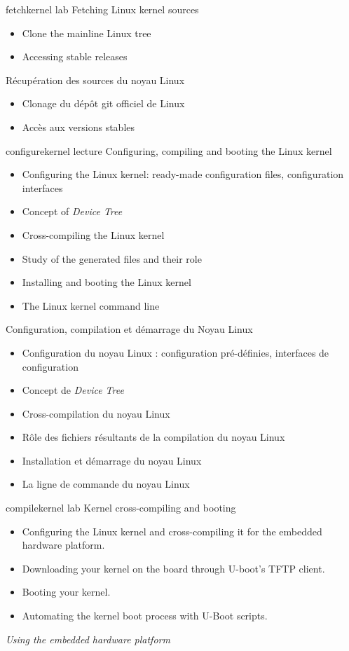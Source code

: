 {fetchkernel}
{lab}
{Fetching Linux kernel sources}
{
  \begin{itemize}
  \item Clone the mainline Linux tree
  \item Accessing stable releases
  \end{itemize}
}
{Récupération des sources du noyau Linux}
{
  \begin{itemize}
  \item Clonage du dépôt git officiel de Linux
  \item Accès aux versions stables
  \end{itemize}
}
{configurekernel}
{lecture}
{Configuring, compiling and booting the Linux kernel}
{
  \begin{itemize}
  \item Configuring the Linux kernel: ready-made configuration files,
    configuration interfaces
  \item Concept of {\em Device Tree}
  \item Cross-compiling the Linux kernel
  \item Study of the generated files and their role
  \item Installing and booting the Linux kernel
  \item The Linux kernel command line
  \end{itemize}
}
{Configuration, compilation et démarrage du Noyau Linux}
{
  \begin{itemize}
  \item Configuration du noyau Linux : configuration pré-définies,
    interfaces de configuration
  \item Concept de {\em Device Tree}
  \item Cross-compilation du noyau Linux
  \item Rôle des fichiers résultants de la compilation du noyau Linux
  \item Installation et démarrage du noyau Linux
  \item La ligne de commande du noyau Linux
  \end{itemize}
}
{compilekernel}
{lab}
{Kernel cross-compiling and booting}
{
  \begin{itemize}
  \item Configuring the Linux kernel and cross-compiling it for the
    embedded hardware platform.
  \item Downloading your kernel on the board through U-boot's TFTP
    client.
  \item Booting your kernel.
  \item Automating the kernel boot process with U-Boot scripts.
  \end{itemize}

  \vspace{0.5cm}
  {\em Using the embedded hardware platform}
}
